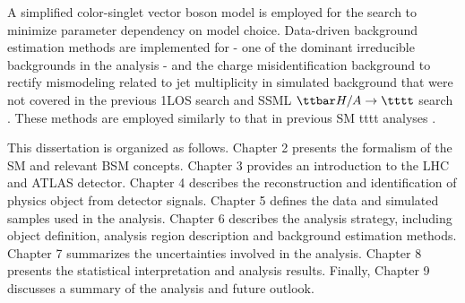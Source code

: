 \documentclass[../thesis.tex]{subfiles}
\begin{document}
A simplified color-singlet vector boson model \citep{theory:ttZp} is employed for the search to minimize parameter dependency on model choice.
Data-driven background estimation methods are implemented for \ttW - one of the dominant irreducible backgrounds in the analysis - and the charge misidentification background to rectify mismodeling related to jet multiplicity in simulated background that were not covered in the previous \acs{1LOS} \ttZp search \citep{theory:ttZp_1los} and \acs{SSML} $\ttbar H/A\rightarrow\tttt$ search \citep{ttHA}. These methods are employed similarly to that in previous \acs{SM} \acs{tttt} analyses \citep{tttt_evidence,tttt_obs}.

This dissertation is organized as follows. Chapter 2 presents the formalism of the \acs{SM} and relevant \acs{BSM} concepts. Chapter 3 provides an introduction to the \acs{LHC} and \acs{ATLAS} detector. Chapter 4 describes the reconstruction and identification of physics object from detector signals. Chapter 5 defines the data and simulated samples used in the analysis. Chapter 6 describes the analysis strategy, including object definition, analysis region description and background estimation methods. Chapter 7 summarizes the uncertainties involved in the analysis. Chapter 8 presents the statistical interpretation and analysis results. Finally, Chapter 9 discusses a summary of the analysis and future outlook.
\end{document}
